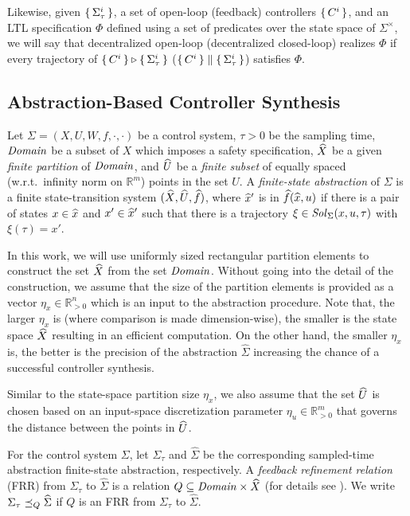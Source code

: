 Likewise, given $\set{\Sigma_\tau^i} $, a set of open-loop (feedback) controllers $\set{C^i} $, and an LTL specification $\Phi$ defined using a set of predicates over the state space of $\Sigma^\times$, we will say that decentralized open-loop (decentralized closed-loop) realizes $\Phi$ if every trajectory of $\set{C^i}\triangleright \set{\Sigma_\tau^i}$ ($\set{C^i}\parallel \set{\Sigma_\tau^i}$) satisfies $\Phi$.

\subsection{Abstraction-Based Controller Synthesis}
Let $\Sigma = (X, U, W, f, \cdot, \cdot)$ be a control system, $\tau>0$ be the sampling time, $\mathit{Domain}$ be a subset of $X$ which imposes a safety specification, $\widehat{X}$ be a given \emph{finite partition} of $\mathit{Domain}$, and $\widehat{U}$ be a \emph{finite subset} of equally spaced (w.r.t.\ infinity norm on $\mathbb{R}^m$) points in the set $U$. A \emph{finite-state abstraction} of $\Sigma$ is a finite state-transition system $(\widehat{X},\widehat{U},\widehat{f})$, where $\widehat{x}'$ is in $\widehat{f}(\widehat{x},u)$ if there is a pair of states $x\in \widehat{x}$ and $x'\in \widehat{x}'$ such that there is a trajectory $\xi\in \mathit{Sol}_\Sigma(x,u,\tau)$ with $\xi(\tau)=x'$.

In this work, we will use uniformly sized rectangular partition elements to construct the set $\widehat{X}$ from the set $\mathit{Domain}$.
Without going into the detail of the construction, we assume that the size of the partition elements is provided as a vector $\eta_x\in \mathbb{R}^n_{>0}$ which is an input to the abstraction procedure.
Note that, the larger $\eta_x$ is (where comparison is made dimension-wise), the smaller is the state space $\widehat{X}$ resulting in an efficient computation.
On the other hand, the smaller $\eta_x$ is, the better is the precision of the abstraction $\widehat{\Sigma}$ increasing the chance of a successful controller synthesis.

Similar to the state-space partition size $\eta_x$, we also assume that the set $\widehat{U}$ is chosen based on an input-space discretization parameter $\eta_u\in \mathbb{R}^m_{>0}$ that governs the distance between the points in $\widehat{U}$. 

For the control system $\Sigma$, let $\Sigma_\tau$ and $\hat \Sigma$ be the corresponding sampled-time abstraction  finite-state abstraction, respectively. A \emph{feedback refinement relation} (FRR) from $\Sigma_\tau$ to $\widehat{\Sigma}$ 
is a relation $Q\subseteq \mathit{Domain}\times \widehat{X}$ (for details see \cite{reissig2016feedback}). We write $\Sigma_\tau \preceq_{Q} \widehat{\Sigma}$ if $Q$ is an FRR from $\Sigma_\tau$ to $\widehat{\Sigma}$.

